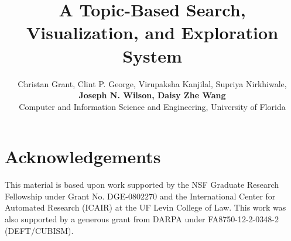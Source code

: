 \documentclass[letterpaper]{article}
\begin{document}
\title{A Topic-Based Search, Visualization, and Exploration System}
\author{Christan Grant, Clint P. George, Virupaksha Kanjilal, Supriya Nirkhiwale, \\ 
{\bf \Large Joseph N. Wilson, Daisy Zhe Wang}\\
Computer and Information Science and Engineering, University of Florida}

\maketitle










\section{Acknowledgements}

This material is based upon work supported by the NSF Graduate 
Research Fellowship under Grant No. 
DGE-$0802270$ and the International Center for Automated 
Research (ICAIR) at the UF Levin College of Law. 
This work was also supported by a generous grant from DARPA under
FA8750-12-2-0348-2 (DEFT/CUBISM).




\end{document}

